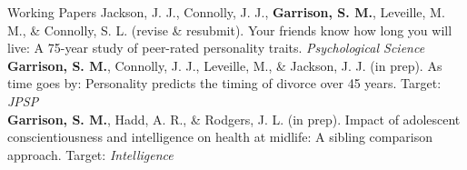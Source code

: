 \documentclass {resume}
\newcommand{\meb}{{\bf Garrison, S. M.}\xspace}
\begin{document}
\begin{rSection}{\textrm{Working Papers}}%
Jackson, J. J., Connolly, J. J., \meb, Leveille, M. M., \& Connolly, S. L. (revise \& resubmit). Your \hspace* {6 mm}friends know how long you will live: A 75-year study of peer-rated personality traits. \textit{Psychological Science}\smallskip\\
\meb, Connolly, J. J., Leveille, M., \& Jackson, J. J. (in prep). As time goes by: Personality predicts the \hspace* {6 mm}timing of divorce over 45 years. Target: \textit{JPSP}\smallskip\\
\meb, Hadd, A. R., \& Rodgers, J. L. (in prep). Impact of adolescent conscientiousness and intelligence \hspace* {6 mm}on health at midlife: A sibling comparison approach. Target: \textit{Intelligence}
\end{rSection}%
\end{document}
